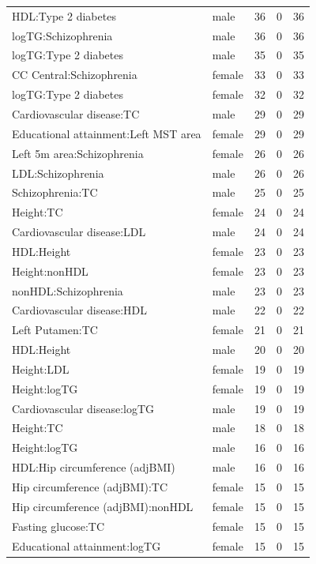 \begin{table}[ht]
\begin{tabular}{llrrr}
  HDL:Type 2 diabetes & male &  36 &   0 &  36 \\ 
  logTG:Schizophrenia & male &  36 &   0 &  36 \\ 
  logTG:Type 2 diabetes & male &  35 &   0 &  35 \\ 
  CC Central:Schizophrenia & female &  33 &   0 &  33 \\ 
  logTG:Type 2 diabetes & female &  32 &   0 &  32 \\ 
  Cardiovascular disease:TC & male &  29 &   0 &  29 \\ 
  Educational attainment:Left MST area & female &  29 &   0 &  29 \\ 
  Left 5m area:Schizophrenia & female &  26 &   0 &  26 \\ 
  LDL:Schizophrenia & male &  26 &   0 &  26 \\ 
  Schizophrenia:TC & male &  25 &   0 &  25 \\ 
  Height:TC & female &  24 &   0 &  24 \\ 
  Cardiovascular disease:LDL & male &  24 &   0 &  24 \\ 
  HDL:Height & female &  23 &   0 &  23 \\ 
  Height:nonHDL & female &  23 &   0 &  23 \\ 
  nonHDL:Schizophrenia & male &  23 &   0 &  23 \\ 
  Cardiovascular disease:HDL & male &  22 &   0 &  22 \\ 
  Left Putamen:TC & female &  21 &   0 &  21 \\ 
  HDL:Height & male &  20 &   0 &  20 \\ 
  Height:LDL & female &  19 &   0 &  19 \\ 
  Height:logTG & female &  19 &   0 &  19 \\ 
  Cardiovascular disease:logTG & male &  19 &   0 &  19 \\ 
  Height:TC & male &  18 &   0 &  18 \\ 
  Height:logTG & male &  16 &   0 &  16 \\ 
  HDL:Hip circumference (adjBMI) & male &  16 &   0 &  16 \\ 
  Hip circumference (adjBMI):TC & female &  15 &   0 &  15 \\ 
  Hip circumference (adjBMI):nonHDL & female &  15 &   0 &  15 \\ 
  Fasting glucose:TC & female &  15 &   0 &  15 \\ 
  Educational attainment:logTG & female &  15 &   0 &  15 \\ 

\end{tabular}
\end{table}
